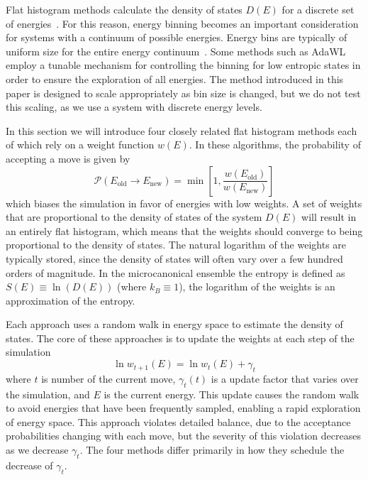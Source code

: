 \documentclass[letterpaper,twocolumn,amsmath,amssymb,pre,aps,10pt]{revtex4-1}
\begin{document}
Flat histogram methods calculate the density of states $D(E)$ for a discrete set
of energies~\cite{wang2001determining, dayal2004performance, troyer2003flat,
trebst2004optimizing}. For this reason, energy binning becomes an important
consideration for systems with a continuum of possible energies.  Energy bins
are typically of uniform size for the entire energy
continuum~\cite{fasnacht2004adaptive}. Some methods such as
AdaWL~\cite{koh2013dynamically} employ a tunable mechanism for controlling the
binning for low entropic states in order to ensure the exploration of all
energies.  The method introduced in this paper is designed to scale
appropriately as bin size is changed, but we do not test this scaling, as we use
a system with discrete energy levels.

In this section we will introduce four closely related flat histogram
methods each of which rely on a weight function $w(E)$.  In these
algorithms, the probability of accepting a move is given by
\begin{equation}
	\mathcal{P}(E_\text{old} \rightarrow E_\text{new})
	= \min\left[1,\frac{w(E_\text{old})}{w(E_\text{new})}\right]
\end{equation}
which biases the simulation in favor of energies with low weights.  A
set of weights that are proportional to the density of states of the
system $D(E)$ will result in an entirely flat histogram, which means that the
weights should converge to being proportional to the density of states.  The
natural logarithm of the weights are typically stored, since the density of
states will often vary over a few hundred orders of magnitude.
In the microcanonical ensemble the entropy is defined
as $S(E) \equiv \ln(D(E))$ (where $k_B \equiv 1$), the logarithm of the weights
is an approximation of the entropy.

Each approach uses a random walk in energy space to
estimate the density of states.  The core of these approaches
is to update the weights at each step of the simulation
\begin{equation}
	\ln{w_{t+1}(E)}=\ln{w_{t}(E)}
	+\gamma_t
\end{equation}
where $t$ is number of the current move, $\gamma_t(t)$ is a
update factor that varies over the simulation, and $E$ is the current energy.  This
update causes the random walk to avoid energies that have been
frequently sampled, enabling a rapid exploration of energy space.
This approach violates detailed balance, due to the
acceptance probabilities changing with each move, but the severity of
this violation decreases as we decrease $\gamma_t$.  The four methods
differ primarily in how they schedule the decrease of $\gamma_t$.
\end{document}
